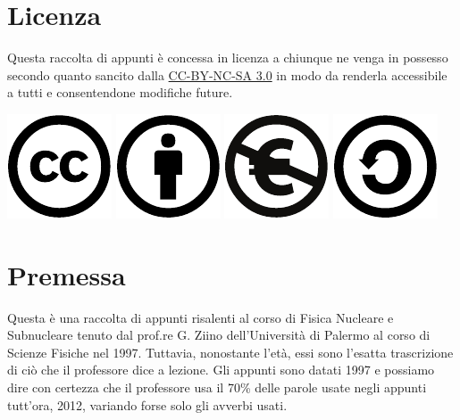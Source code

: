 \chapter{Licenza}
Questa raccolta di appunti è concessa in licenza a chiunque ne venga in possesso
secondo quanto sancito dalla \href{http://creativecommons.org/licenses/by-nc-sa/3.0/it/}{CC-BY-NC-SA 3.0}
in modo da renderla accessibile a tutti e consentendone modifiche future.
\begin{flushright}
\includegraphics[scale=1]{img/cc}
\includegraphics[scale=1]{img/by}
\includegraphics[scale=1]{img/nc-eu}
\includegraphics[scale=1]{img/sa}
\end{flushright}
\chapter{Premessa}
\vfill
Questa è una raccolta di appunti risalenti al corso di Fisica Nucleare e
Subnucleare tenuto dal prof.re G. Ziino dell'Università di Palermo al corso di
Scienze Fisiche nel 1997. Tuttavia, nonostante l'età, essi sono l'esatta
trascrizione di ciò che il professore dice a lezione. Gli appunti sono datati
1997 e possiamo dire con certezza che il professore usa il 70\% delle parole
usate negli appunti tutt'ora, 2012, variando forse solo gli avverbi usati.

